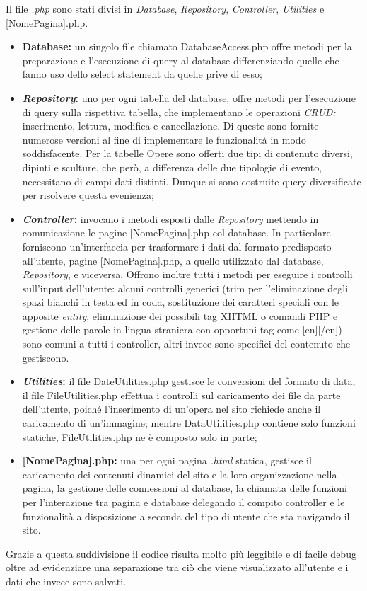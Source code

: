 Il file \textit{.php} sono stati divisi in \textit{Database}, \textit{Repository}, \textit{Controller}, \textit{Utilities} e [NomePagina].php. 
\begin{itemize}
	\item \textbf{Database:} un singolo file chiamato DatabaseAccess.php offre metodi per la preparazione e l'esecuzione di query al database differenziando quelle che fanno uso dello select statement da quelle prive di esso;
	\item \textbf{\textit{Repository}:} uno per ogni tabella del database, offre metodi per l'esecuzione di query sulla rispettiva tabella, che implementano le operazioni \textit{CRUD:} inserimento, lettura, modifica e cancellazione. Di queste sono fornite numerose versioni al fine di implementare le funzionalità in modo soddisfacente. Per la tabelle Opere sono offerti due tipi di contenuto diversi, dipinti e sculture, che però, a differenza delle due tipologie di evento, necessitano di campi dati distinti. Dunque si sono costruite query diversificate per risolvere questa evenienza;
	\item \textbf{\textit{Controller}:} invocano i metodi esposti dalle \textit{Repository} mettendo in comunicazione le pagine [NomePagina].php col database.
	In particolare forniscono un'interfaccia per trasformare i dati dal formato predisposto all'utente, pagine [NomePagina].php, a quello utilizzato dal database, \textit{Repository}, e viceversa. Offrono inoltre tutti i metodi per eseguire i controlli sull'input dell'utente: alcuni controlli generici (trim per l'eliminazione degli spazi bianchi in testa ed in coda, sostituzione dei caratteri speciali con le apposite \textit{entity}, eliminazione dei possibili tag XHTML o comandi PHP e gestione delle parole in lingua straniera con opportuni tag come [en][/en]) sono comuni a tutti i controller, altri invece sono specifici del contenuto che gestiscono.
	\item \textbf{\textit{Utilities}:} il file DateUtilities.php gestisce le conversioni del formato di data; il file FileUtilities.php effettua i controlli sul caricamento dei file da parte dell'utente, poiché l'inserimento di un'opera nel sito richiede anche il caricamento di un'immagine; mentre DataUtilities.php contiene solo funzioni statiche, FileUtilities.php ne è composto solo in parte;
	\item \textbf{[NomePagina].php:} una per ogni pagina \textit{.html} statica, gestisce il caricamento dei contenuti dinamici del sito e la loro organizzazione nella pagina, la gestione delle connessioni al database, la chiamata delle funzioni per l'interazione tra pagina e database delegando il compito controller e le funzionalità a disposizione a seconda del tipo di utente che sta navigando il sito.
\end{itemize}
Grazie a questa suddivisione il codice risulta molto più leggibile e di facile debug oltre ad evidenziare una separazione tra ciò che viene visualizzato all'utente e i dati che invece sono salvati.

